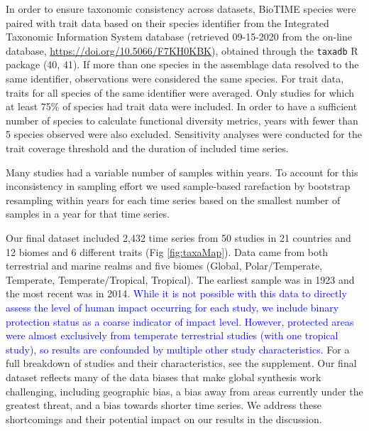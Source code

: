 \documentclass{article}
\begin{document}
In order to ensure taxonomic consistency across datasets, BioTIME
species were paired with trait data based on their species identifier
from the Integrated Taxonomic Information System database (retrieved
09-15-2020 from the on-line database,
\url{https://doi.org/10.5066/F7KH0KBK}), obtained through the
\texttt{taxadb} R package (40, 41). If more than one species in the
assemblage data resolved to the same identifier, observations were
considered the same species. For trait data, traits for all species of
the same identifier were averaged. Only studies for which at least 75\%
of species had trait data were included. In order to have a sufficient
number of species to calculate functional diversity metrics, years with
fewer than 5 species observed were also excluded. Sensitivity analyses
were conducted for the trait coverage threshold and the duration of
included time series.

Many studies had a variable number of samples within years. To account
for this inconsistency in sampling effort we used sample-based
rarefaction by bootstrap resampling within years for each time series
based on the smallest number of samples in a year for that time series.

Our final dataset included 2,432 time series from 50 studies in 21
countries and 12 biomes and 6 different traits (Fig \ref{fig:taxaMap}).
Data came from both terrestrial and marine realms and five biomes
(Global, Polar/Temperate, Temperate, Temperate/Tropical, Tropical). The
earliest sample was in 1923 and the most recent was in 2014.
\textcolor{blue}{While it is not possible with this data to directly assess the level of human impact occurring for each study, we include binary protection status as a coarse indicator of impact level. However, protected areas were almost exclusively from temperate terrestrial studies (with one tropical study), so results are confounded by multiple other study characteristics.}
For a full breakdown of studies and their characteristics, see the
supplement. Our final dataset reflects many of the data biases that make
global synthesis work challenging, including geographic bias, a bias
away from areas currently under the greatest threat, and a bias towards
shorter time series. We address these shortcomings and their potential
impact on our results in the discussion.
\end{document}
